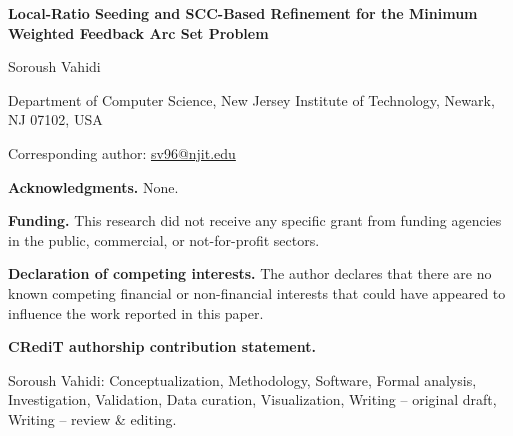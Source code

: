 \documentclass[12pt]{article}
\begin{document}
\begin{center}
{\Large\bfseries Local-Ratio Seeding and SCC-Based Refinement for the Minimum Weighted Feedback Arc Set Problem\par}
\vspace{1.2em}
{\large Soroush Vahidi\par}
\vspace{0.4em}
Department of Computer Science, New Jersey Institute of Technology, Newark, NJ 07102, USA\par
\vspace{0.4em}
Corresponding author: \href{mailto:sv96@njit.edu}{sv96@njit.edu}
\end{center}

\textbf{Acknowledgments.} None.

\textbf{Funding.} This research did not receive any specific grant from funding agencies in the public, commercial, or not-for-profit sectors.

\textbf{Declaration of competing interests.} The author declares that there are no known competing financial or non-financial interests that could have appeared to influence the work reported in this paper.

\textbf{CRediT authorship contribution statement.}\par
\small
\noindent\parbox{0.97\textwidth}{Soroush Vahidi: Conceptualization, Methodology, Software, Formal analysis, Investigation, Validation, Data curation, Visualization, Writing -- original draft, Writing -- review \& editing.}
\end{document}

